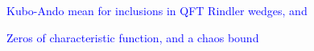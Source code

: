 \documentclass[a4paper,11pt]{article}
\theoremstyle{definition}
\newcommand{\nn}{\nonumber}
\newcommand{\lb}{\left(}
\newcommand{\rb}{\right)}
\newcommand{\NL}[1]{\textcolor{blue}{#1}}
\begin{document}
\NL{Kubo-Ando mean for inclusions in QFT Rindler wedges, and }

\NL{Zeros of characteristic function, and a chaos bound}









\end{document}
